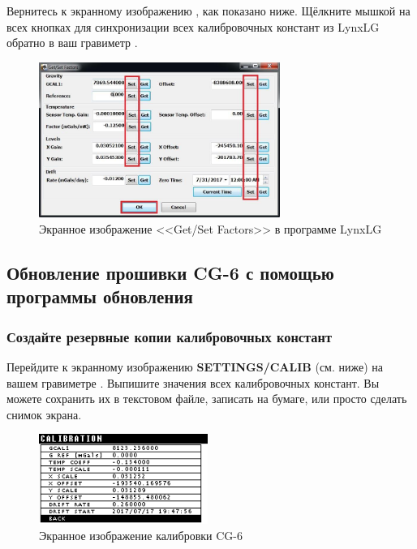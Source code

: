 Вернитесь к экранному изображению  , как показано ниже. Щёлкните мышкой на всех кнопках  для
синхронизации всех калибровочных констант из LynxLG обратно в ваш гравиметр
\cg{}.

\begin{figure}[H]
  \centering
  \includegraphics[width=0.7\textwidth]{figures/the_lynxlg_sortware_get_set_factors_screen}
  \caption{Экранное изображение <<Get/Set Factors>> в программе LynxLG}
  \label{fig:the_lynxlg_sortware_get_set_factors_screen}
\end{figure}


\subsection[Обновление прошивки с помощью программы обновления]{Обновление
  прошивки CG-6 с помощью программы обновления}
\label{subsec:upgrade_the_cg6_firmware_with_cg6_firmware_updater_software}

\subsubsection{Создайте резервные копии калибровочных констант}

Перейдите к экранному изображению \textbf{SETTINGS/CALIB} (см. ниже) на вашем
гравиметре \cg{}. Выпишите значения всех калибровочных констант.  Вы можете
сохранить их в текстовом файле, записать на бумаге, или просто сделать снимок
экрана.

\begin{figure}[H]
  \centering
  \includegraphics[width=0.49\textwidth]{figures/the_cg6_calibration_screen}
  \caption{Экранное изображение калибровки CG-6}
  \label{fig:the_cg6_calibration_screen_2}
\end{figure}

